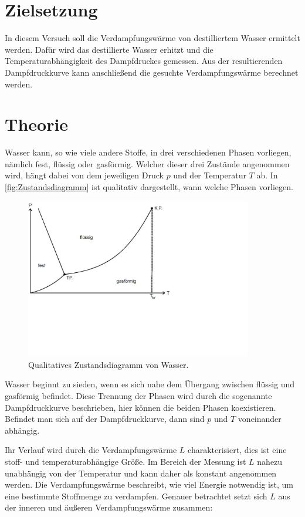 \section{Zielsetzung}
\label{sec:Zielsetzung}

In diesem Versuch soll die Verdampfungswärme von destilliertem Wasser ermittelt werden.
Dafür wird das destillierte Wasser erhitzt und die Temperaturabhängigkeit des Dampfdruckes gemessen. 
Aus der resultierenden Dampfdruckkurve kann anschließend die gesuchte Verdampfungswärme berechnet werden.

\section{Theorie}
\label{sec:Theorie}

Wasser kann, so wie viele andere Stoffe, in drei verschiedenen Phasen vorliegen, nämlich fest, flüssig oder gasförmig.
Welcher dieser drei Zustände angenommen wird, hängt dabei von dem jeweiligen Druck $p$ und der Temperatur $T$ ab.
In \autoref{fig:Zustandsdiagramm} ist qualitativ dargestellt, wann welche Phasen vorliegen.

\begin{figure} [H]
    \centering
    \includegraphics[height=7cm]{content/Bilder/Zustandsdiagramm.pdf}
    \caption{Qualitatives Zustandsdiagramm von Wasser. \cite{v203}}
    \label{fig:Zustandsdiagramm}
\end{figure}

Wasser beginnt zu sieden, wenn es sich nahe dem Übergang zwischen flüssig und gasförmig befindet.
Diese Trennung der Phasen wird durch die sogenannte Dampfdruckkurve beschrieben, hier können die beiden Phasen koexistieren.
Befindet man sich auf der Dampfdruckkurve, dann sind $p$ und $T$ voneinander abhängig.

Ihr Verlauf wird durch die Verdampfungswärme $L$ charakterisiert, dies ist eine stoff- und temperaturabhängige Größe.
Im Bereich der Messung ist $L$ nahezu unabhängig von der Temperatur und kann daher als konstant angenommen werden.
Die Verdampfungswärme beschreibt, wie viel Energie notwendig ist, um eine bestimmte Stoffmenge zu verdampfen.
Genauer betrachtet setzt sich $L$ aus der inneren und äußeren Verdampfungswärme zusammen:

